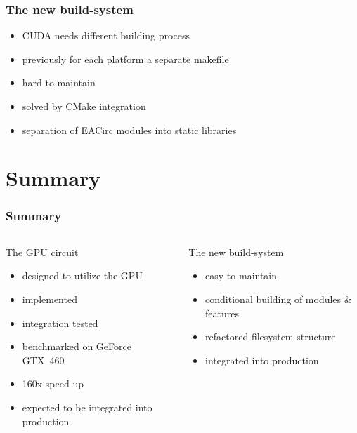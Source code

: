 \documentclass[czech]{beamer}
\begin{document}
	\begin{frame}
		\frametitle{The new build-system}
		\begin{itemize}
			\item CUDA needs different building process
			\item previously for each platform a separate makefile
			\item hard to maintain
		\end{itemize}
		\bigskip
		\begin{itemize}
			\item solved by CMake integration
			\item separation of EACirc modules into static libraries
		\end{itemize}
	\end{frame}
	
	\section{Summary}
	\begin{frame}
		\frametitle{Summary}
		\begin{columns}[c]
			\begin{column}{.5\textwidth}
				The GPU circuit
				\begin{itemize}
					\item designed to utilize the GPU
					\item implemented
					\item integration tested
					\item benchmarked on GeForce GTX~460
					\item 160x speed-up
					\item expected to be integrated into production
				\end{itemize}
			\end{column}
			\hfill\vline\hfill
			\begin{column}{.5\textwidth}
				The new build-system
				\begin{itemize}
					\item easy to maintain
					\item conditional building of modules \& features
					\item refactored filesystem structure
					\item integrated into production
				\end{itemize}
			\end{column}
		\end{columns}
	\end{frame}
\end{document}
